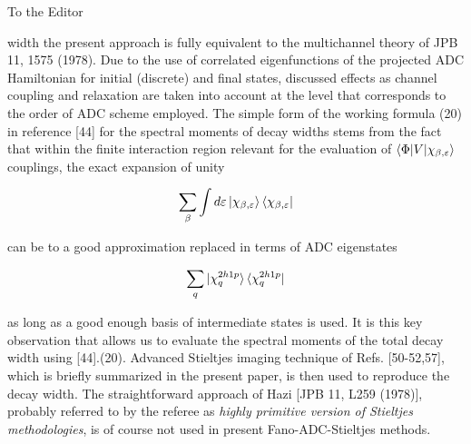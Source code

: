 \documentclass[DIN,pagenumber=false,parskip=half,fromalign=left,fromphone=true,fromemail=true,fromurl=false,fromlogo=false,fromrule=false]{scrlttr2}
\begin{document}
\begin{letter}{To the Editor}
\begin{enumerate}
         width the present approach is fully equivalent to the multichannel
         theory of JPB 11,
         1575 (1978). Due to the use of correlated eigenfunctions of the
         projected ADC Hamiltonian for initial (discrete) and final states,
         discussed effects as channel coupling and relaxation are taken into
         account at the level that corresponds to the order of ADC scheme
         employed. The simple form of the working formula (20) in reference [44]
         for the
         spectral moments of decay widths stems from the fact
         that within the finite interaction region relevant for the evaluation of
         $\braket{\Phi|V|\chi_{\beta,\varepsilon}}$ couplings,
         the exact expansion of unity
         
         \begin{equation*}
          \sum_\beta \int d\varepsilon \ket{\chi_{\beta,\varepsilon}}
                                       \bra{\chi_{\beta,\varepsilon}}
         \end{equation*}
         
         can be to a good approximation replaced in terms of ADC eigenstates
         
         \begin{equation*}
          \sum_q \ket{\chi^{2h1p}_q} \bra{\chi^{2h1p}_q}
         \end{equation*}
         
         as long as a good enough basis of intermediate states is used. It is this
         key observation that allows us to evaluate the spectral moments of the
         total decay width using [44].(20). Advanced Stieltjes imaging technique
         of Refs. [50-52,57], which is briefly summarized in the present paper,
         is then used to reproduce the decay width. The straightforward approach
         of Hazi [JPB 11, L259 (1978)], probably referred to by the referee as
         \emph{highly primitive version of Stieltjes methodologies}, is of course not
         used in present Fano-ADC-Stieltjes methods.
         

\end{enumerate}
\end{letter}
\end{document}
